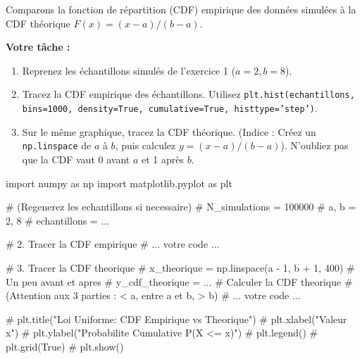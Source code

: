 \begin{exercicebox}
Comparons la fonction de répartition (CDF) empirique des données simulées à la CDF théorique $F(x) = (x-a)/(b-a)$.

\textbf{Votre tâche :}
\begin{enumerate}
    \item Reprenez les échantillons simulés de l'exercice 1 ($a=2, b=8$).
    \item Tracez la CDF empirique des échantillons. Utilisez \texttt{plt.hist(echantillons, bins=1000, density=True, cumulative=True, histtype='step')}.
    \item Sur le même graphique, tracez la CDF théorique. (Indice : Créez un \texttt{np.linspace} de $a$ à $b$, puis calculez $y = (x-a)/(b-a)$). N'oubliez pas que la CDF vaut 0 avant $a$ et 1 après $b$.
\end{enumerate}

\begin{codecell}
import numpy as np
import matplotlib.pyplot as plt

# (Regenerez les echantillons si necessaire)
# N_simulations = 100000
# a, b = 2, 8
# echantillons = ...

# 2. Tracer la CDF empirique
# ... votre code ...

# 3. Tracer la CDF theorique
# x_theorique = np.linspace(a - 1, b + 1, 400) # Un peu avant et apres
# y_cdf_theorique = ... # Calculer la CDF theorique
# (Attention aux 3 parties : < a, entre a et b, > b)
# ... votre code ...

# plt.title("Loi Uniforme: CDF Empirique vs Theorique")
# plt.xlabel("Valeur x")
# plt.ylabel("Probabilite Cumulative P(X <= x)")
# plt.legend()
# plt.grid(True)
# plt.show()
\end{codecell}
\end{exercicebox}

